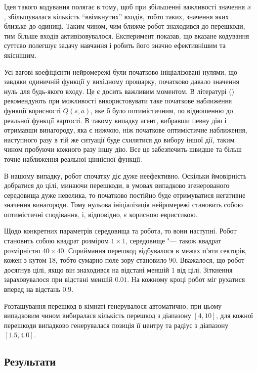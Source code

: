 \documentclass[a4paper,10pt,fleqn]{article}
\begin{document}
Ідея такого кодування полягає в тому, щоб при збільшенні важливості значення $x$, збільшувалася кількість ``ввімкнутих'' входів, тобто таких, значення яких близьке до одиниці. Таким чином, чим ближче робот знаходився до перешкоди, тим більше входів активізовувалося. Експеримент показав, що вказане кодування суттєво полегшує задачу навчання і робить його значно ефективнішим та якіснішим.

Усі вагові коефіцієнти нейромережі були початково ініціалізовані нулями, що завдяки одиничній функції у вихідному прошарку, початково давало значення нуль для будь-якого входу. Це є досить важливим моментом. В літературі (\cite{SuttonBarto2002}) рекомендують при можливості використовувати таке початкове наближення функції корисності $Q(s,a)$, яке б було оптимістичним, по відношенню до реальної функції вартості. В такому випадку агент, вибравши певну дію і отримавши винагороду, яка є нижчою, ніж початкове оптимістичне наближення, наступного разу в тій же ситуації буде схилятися до вибору іншої дії, таким чином пробуючи кожного разу іншу дію. Все це забезпечить швидше та більш точне наближення реальної ціннісної функції.

В нашому випадку, робот спочатку діє дуже неефективно. Оскільки ймовірність добратися до цілі, минаючи перешкоди, в умовах випадково згенерованого середовища дуже невелика, то початково постійно буде отримуватися негативне значення винагороди. Тому нульова ініціалізація нейромережі становить собою оптимістичні сподівання, і, відповідно, є корисною евристикою.

Щодо конкретних параметрів середовища та робота, то вони наступні. Робот становить собою квадрат розміром $1 \times 1$, середовище "--- також квадрат розмірністю $40 \times 40$. Сприймання перешкод відбувалося в межах п'яти секторів, кожен з кутом 18\textdegree, тобто сумарно поле зору становило 90\textdegree. Вважалося, що робот досягнув цілі, якщо він знаходився на відстані меншій $1$ від цілі. Зіткнення зараховувалося при відстані меншій $0.01$. На кожному кроці робот міг рухатися вперед на відстань $0.9$.

Розташування перешкод в кімнаті генерувалося автоматично, при цьому випадковим чином вибиралася кількість перешкод з діапазону $[4,10]$, для кожної перешкоди випадково генерувалася позиція її центру та радіус з діапазону $[1.5, 4.0]$.

\subsection{Результати}
\end{document}
